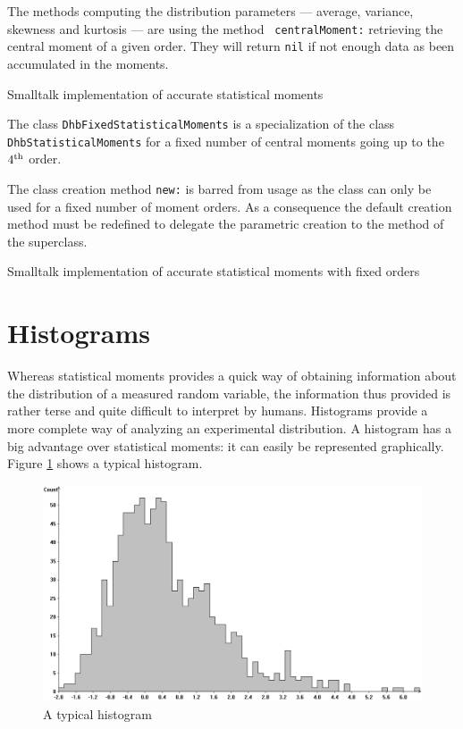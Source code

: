 \documentclass[twoside]{book}
\begin{document}
The methods computing the distribution parameters --- average,
variance, skewness and kurtosis --- are using the method {\tt
centralMoment:} retrieving the central moment of a given order.
They will return {\tt nil} if not enough data as been accumulated
in the moments.

\begin{listing} Smalltalk implementation of accurate statistical moments \label{ls:genmoments}

\end{listing}

The class {\tt DhbFixedStatisticalMoments} is a specialization of
the class {\tt DhbStatisticalMoments} for a fixed number of
central moments going up to the $4^{\mathop{\rm th}}$ order.

The class creation method {\tt new:} is barred from usage as the
class can only be used for a fixed number of moment orders. As a
consequence the default creation method must be redefined to
delegate the parametric creation to the method of the superclass.

\begin{listing} Smalltalk implementation of accurate statistical moments with fixed orders \label{ls:fixedmoments}

\end{listing}

\section{Histograms}
\label{sec:histogram} Whereas statistical moments provides a quick
way of obtaining information about the distribution of a measured
random variable, the information thus provided is rather terse and
quite difficult to interpret by humans. Histograms provide a more
complete way of analyzing an experimental distribution. A
histogram has a big advantage over statistical moments: it can
easily be represented graphically. Figure \ref{fig:histogram}
shows a typical histogram.
\begin{figure}
\centering\includegraphics[width=12cm]{Figures/Histogram}
\caption{A typical histogram}\label{fig:histogram}
\end{figure}
\end{document}
